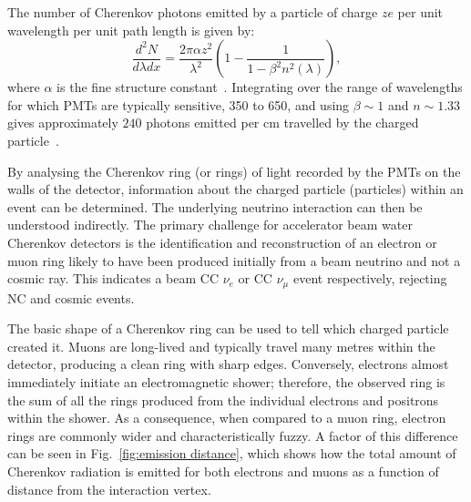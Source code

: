The number of Cherenkov photons emitted by a particle of charge $ze$ per unit wavelength per unit
path length is given by:
\begin{equation}
    \frac{d^{2}N}{d\lambda dx}=\frac{2\pi\alpha z^{2}}{\lambda^{2}}
    \left(1-\frac{1}{1-\beta^{2}n^{2}(\lambda)}\right),
    \label{eq:cherenkov_emission}
\end{equation}
where $\alpha$ is the fine structure constant~\cite{particle2020}. Integrating over the range of
wavelengths for which PMTs are typically sensitive, \unit{350}{} to
\unit{650}{}, and using $\beta\sim 1$ and $n\sim 1.33$ gives approximately $240$
photons emitted per cm travelled by the charged particle~\cite{perch2017}.

By analysing the Cherenkov ring (or rings) of light recorded by the PMTs on the walls of the
detector, information about the charged particle (particles) within an event can be determined.
The underlying neutrino interaction can then be understood indirectly. The primary challenge for
accelerator beam water Cherenkov detectors is the identification and reconstruction of an electron
or muon ring likely to have been produced initially from a beam neutrino and not a cosmic ray.
This indicates a beam CC $\nu_{e}$ or CC $\nu_{\mu}$ event respectively, rejecting NC and cosmic
events.

The basic shape of a Cherenkov ring can be used to tell which charged particle created it. Muons
are long-lived and typically travel many metres within the detector, producing a clean ring with
sharp edges. Conversely, electrons almost immediately initiate an electromagnetic shower;
therefore, the observed ring is the sum of all the rings produced from the individual electrons
and positrons within the shower. As a consequence, when compared to a muon ring, electron rings
are commonly wider and characteristically fuzzy. A factor of this difference can be seen in
Fig.~\ref{fig:emission distance}, which shows how the total amount of Cherenkov radiation is
emitted for both electrons and muons as a function of distance from the interaction vertex.


